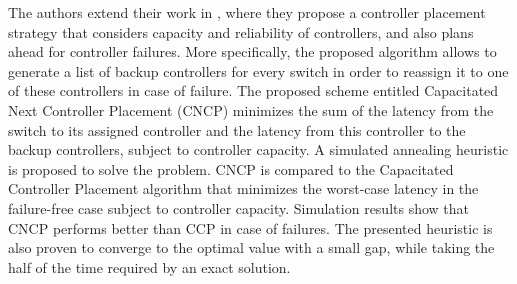 \documentclass[a4paper,10pt]{article}
\begin{document}


The authors extend their work in \cite{KiRa17}, where they propose a controller placement strategy that considers capacity and reliability of controllers, and also plans ahead for controller failures. More specifically, the proposed algorithm allows to generate a list of backup controllers for every switch in order to reassign it to one of these controllers in case of failure. The proposed scheme entitled Capacitated Next Controller Placement (CNCP) minimizes the sum of the latency from the switch to its assigned controller and the latency from this controller to the backup controllers, subject to controller capacity. A simulated annealing heuristic is proposed to solve the problem. CNCP is compared to the Capacitated Controller Placement algorithm that minimizes the worst-case latency in the failure-free case subject to controller capacity. Simulation results show that CNCP performs better than CCP in case of failures. The presented heuristic is also proven to converge to the optimal value with a small gap, while taking the half of the time required by an exact solution. 
\end{document}
